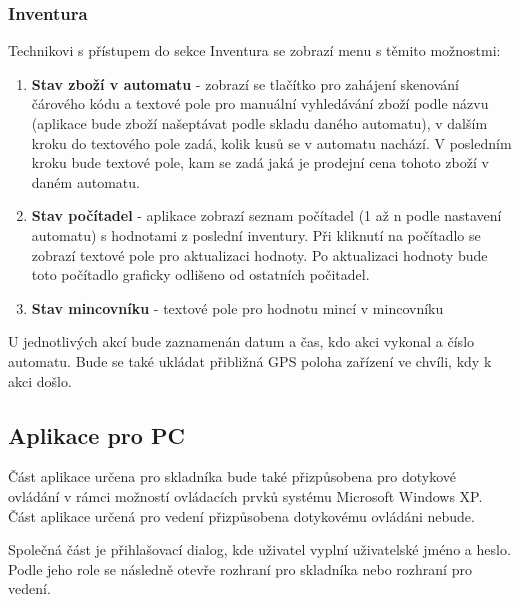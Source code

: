 \documentclass[a4paper,10pt]{article}
\begin{document}
\subsubsection{Inventura}
Technikovi s přístupem do sekce Inventura se zobrazí menu s těmito možnostmi:
\begin{enumerate}
	\item \textbf{Stav zboží v automatu} - zobrazí se tlačítko pro zahájení skenování čárového kódu a textové pole pro manuální vyhledávání zboží podle názvu (aplikace bude zboží našeptávat podle skladu daného automatu), v dalším kroku do textového pole zadá, kolik kusů se v automatu nachází. V posledním kroku bude textové pole, kam se zadá jaká je prodejní cena tohoto zboží v daném automatu.
	\item \textbf{Stav počítadel} - aplikace zobrazí seznam počítadel (1 až n podle nastavení automatu) s hodnotami z poslední inventury. Při kliknutí na počítadlo se zobrazí textové pole pro aktualizaci hodnoty. Po aktualizaci hodnoty bude toto počítadlo graficky odlišeno od ostatních počitadel.
	\item \textbf{Stav mincovníku} - textové pole pro hodnotu mincí v mincovníku
\end{enumerate}

U jednotlivých akcí bude zaznamenán datum a čas, kdo akci vykonal a číslo automatu. Bude se také ukládat přibližná GPS poloha zařízení ve chvíli, kdy k akci došlo.

\subsection{Aplikace pro PC}

Část aplikace určena pro skladníka bude také přizpůsobena pro dotykové ovládání v rámci možností ovládacích prvků systému Microsoft Windows XP. Část aplikace určená pro vedení přizpůsobena dotykovému ovládáni nebude.

Společná část je přihlašovací dialog, kde uživatel vyplní uživatelské jméno a heslo. Podle jeho role se následně otevře rozhraní pro skladníka nebo rozhraní pro vedení.
\end{document}
